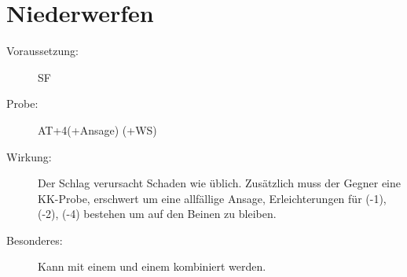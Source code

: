 \section{Niederwerfen}
\label{bAT.niederwerfen}
\begin{description}
    \item[Voraussetzung:]
        SF 
    \item[Probe:]
        AT+4(+Ansage) (+WS)
    \item[Wirkung:]
        Der Schlag verursacht Schaden wie üblich.
        Zusätzlich muss der Gegner eine KK-Probe, erschwert um eine allfällige Ansage, Erleichterungen für  (-1),  (-2),  (-4) bestehen um auf den Beinen zu bleiben.
    \item[Besonderes:]
        Kann mit einem  und einem  kombiniert werden.
\end{description}
